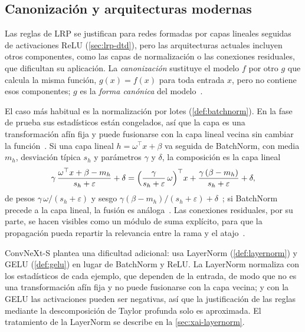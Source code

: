 \subsection{Canonización y arquitecturas modernas}\label{sec:lrp-canonizacion}
Las reglas de LRP se justifican para redes formadas por capas lineales seguidas de
activaciones ReLU (\cref{sec:lrp-dtd}), pero las arquitecturas actuales incluyen
otros componentes, como las capas de normalización o las conexiones residuales, que
dificultan su aplicación. La \emph{canonización} sustituye el modelo $f$ por otro
$g$ que calcula la misma función, $g(x) = f(x)$ para toda entrada $x$, pero no
contiene esos componentes; $g$ es la \emph{forma canónica} del
modelo~\cite[sec.~3]{pahde2023}.

El caso más habitual es la normalización por lotes (\cref{def:batchnorm}). En la fase
de prueba sus estadísticos están congelados, así que la capa es una transformación
afín fija y puede fusionarse con la capa lineal vecina sin cambiar la
función~\cite[sec.~10.3.2]{montavon2019lrp}. Si una capa lineal
$h = \omega^{\top}x + \beta$ va seguida de BatchNorm, con media $m_h$, desviación
típica $s_h$ y parámetros $\gamma$ y $\delta$, la composición es la capa lineal
\[
  \gamma\,\frac{\omega^{\top}x + \beta - m_h}{s_h + \varepsilon} + \delta
  = \Bigl(\frac{\gamma}{s_h + \varepsilon}\,\omega\Bigr)^{\top} x
    + \frac{\gamma\,(\beta - m_h)}{s_h + \varepsilon} + \delta ,
\]
de pesos $\gamma\,\omega/(s_h + \varepsilon)$ y sesgo
$\gamma(\beta - m_h)/(s_h + \varepsilon) + \delta$~\cite[ec.~(4)]{pahde2023}; si
BatchNorm precede a la capa lineal, la fusión es análoga~\cite[ec.~(6)]{pahde2023}.
Las conexiones residuales, por su parte, se hacen visibles como un módulo de suma
explícito, para que la propagación pueda repartir la relevancia entre la rama y el
atajo~\cite{pahde2023}.

ConvNeXt-S plantea una dificultad adicional: usa LayerNorm (\cref{def:layernorm}) y
GELU (\cref{def:gelu}) en lugar de BatchNorm y ReLU. La LayerNorm normaliza con los
estadísticos de cada ejemplo, que dependen de la entrada, de modo que no es una
transformación afín fija y no puede fusionarse con la capa vecina; y con la GELU las
activaciones pueden ser negativas, así que la justificación de las reglas mediante
la descomposición de Taylor profunda solo es aproximada. El tratamiento de la
LayerNorm se describe en la \cref{sec:xai-layernorm}.

